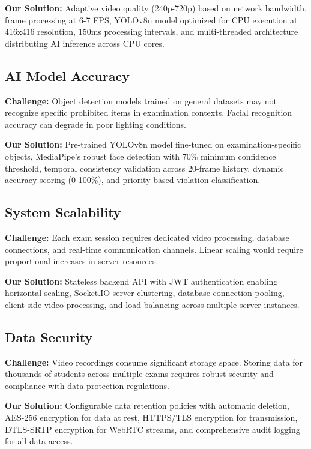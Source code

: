 \textbf{Our Solution:} Adaptive video quality (240p-720p) based on network bandwidth, frame processing at 6-7 FPS, YOLOv8n model optimized for CPU execution at 416x416 resolution, 150ms processing intervals, and multi-threaded architecture distributing AI inference across CPU cores.

\subsection{AI Model Accuracy}

\textbf{Challenge:} Object detection models trained on general datasets may not recognize specific prohibited items in examination contexts. Facial recognition accuracy can degrade in poor lighting conditions.

\textbf{Our Solution:} Pre-trained YOLOv8n model fine-tuned on examination-specific objects, MediaPipe's robust face detection with 70\% minimum confidence threshold, temporal consistency validation across 20-frame history, dynamic accuracy scoring (0-100\%), and priority-based violation classification.

\subsection{System Scalability}

\textbf{Challenge:} Each exam session requires dedicated video processing, database connections, and real-time communication channels. Linear scaling would require proportional increases in server resources.

\textbf{Our Solution:} Stateless backend API with JWT authentication enabling horizontal scaling, Socket.IO server clustering, database connection pooling, client-side video processing, and load balancing across multiple server instances.

\subsection{Data Security}

\textbf{Challenge:} Video recordings consume significant storage space. Storing data for thousands of students across multiple exams requires robust security and compliance with data protection regulations.

\textbf{Our Solution:} Configurable data retention policies with automatic deletion, AES-256 encryption for data at rest, HTTPS/TLS encryption for transmission, DTLS-SRTP encryption for WebRTC streams, and comprehensive audit logging for all data access.

